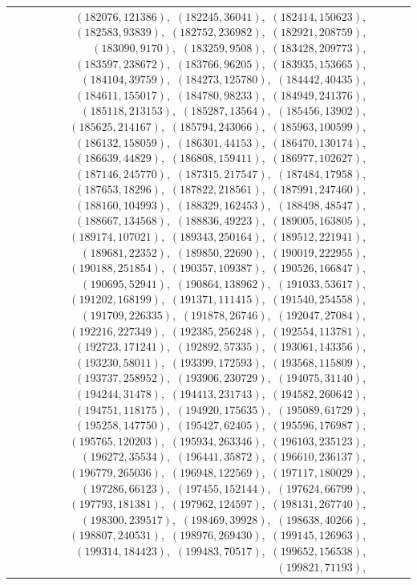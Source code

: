 \documentclass[11pt]{article}
\begin{document}
\begin{longtable}{@{}rrl>{\raggedright\arraybackslash}p{}@{}}
$(182076,121386)$,\allowbreak\ $(182245,36041)$,\allowbreak\ $(182414,150623)$,\allowbreak\ $(182583,93839)$,\allowbreak\ $(182752,236982)$,\allowbreak\ $(182921,208759)$,\allowbreak\ $(183090,9170)$,\allowbreak\ $(183259,9508)$,\allowbreak\ $(183428,209773)$,\allowbreak\ $(183597,238672)$,\allowbreak\ $(183766,96205)$,\allowbreak\ $(183935,153665)$,\allowbreak\ $(184104,39759)$,\allowbreak\ $(184273,125780)$,\allowbreak\ $(184442,40435)$,\allowbreak\ $(184611,155017)$,\allowbreak\ $(184780,98233)$,\allowbreak\ $(184949,241376)$,\allowbreak\ $(185118,213153)$,\allowbreak\ $(185287,13564)$,\allowbreak\ $(185456,13902)$,\allowbreak\ $(185625,214167)$,\allowbreak\ $(185794,243066)$,\allowbreak\ $(185963,100599)$,\allowbreak\ $(186132,158059)$,\allowbreak\ $(186301,44153)$,\allowbreak\ $(186470,130174)$,\allowbreak\ $(186639,44829)$,\allowbreak\ $(186808,159411)$,\allowbreak\ $(186977,102627)$,\allowbreak\ $(187146,245770)$,\allowbreak\ $(187315,217547)$,\allowbreak\ $(187484,17958)$,\allowbreak\ $(187653,18296)$,\allowbreak\ $(187822,218561)$,\allowbreak\ $(187991,247460)$,\allowbreak\ $(188160,104993)$,\allowbreak\ $(188329,162453)$,\allowbreak\ $(188498,48547)$,\allowbreak\ $(188667,134568)$,\allowbreak\ $(188836,49223)$,\allowbreak\ $(189005,163805)$,\allowbreak\ $(189174,107021)$,\allowbreak\ $(189343,250164)$,\allowbreak\ $(189512,221941)$,\allowbreak\ $(189681,22352)$,\allowbreak\ $(189850,22690)$,\allowbreak\ $(190019,222955)$,\allowbreak\ $(190188,251854)$,\allowbreak\ $(190357,109387)$,\allowbreak\ $(190526,166847)$,\allowbreak\ $(190695,52941)$,\allowbreak\ $(190864,138962)$,\allowbreak\ $(191033,53617)$,\allowbreak\ $(191202,168199)$,\allowbreak\ $(191371,111415)$,\allowbreak\ $(191540,254558)$,\allowbreak\ $(191709,226335)$,\allowbreak\ $(191878,26746)$,\allowbreak\ $(192047,27084)$,\allowbreak\ $(192216,227349)$,\allowbreak\ $(192385,256248)$,\allowbreak\ $(192554,113781)$,\allowbreak\ $(192723,171241)$,\allowbreak\ $(192892,57335)$,\allowbreak\ $(193061,143356)$,\allowbreak\ $(193230,58011)$,\allowbreak\ $(193399,172593)$,\allowbreak\ $(193568,115809)$,\allowbreak\ $(193737,258952)$,\allowbreak\ $(193906,230729)$,\allowbreak\ $(194075,31140)$,\allowbreak\ $(194244,31478)$,\allowbreak\ $(194413,231743)$,\allowbreak\ $(194582,260642)$,\allowbreak\ $(194751,118175)$,\allowbreak\ $(194920,175635)$,\allowbreak\ $(195089,61729)$,\allowbreak\ $(195258,147750)$,\allowbreak\ $(195427,62405)$,\allowbreak\ $(195596,176987)$,\allowbreak\ $(195765,120203)$,\allowbreak\ $(195934,263346)$,\allowbreak\ $(196103,235123)$,\allowbreak\ $(196272,35534)$,\allowbreak\ $(196441,35872)$,\allowbreak\ $(196610,236137)$,\allowbreak\ $(196779,265036)$,\allowbreak\ $(196948,122569)$,\allowbreak\ $(197117,180029)$,\allowbreak\ $(197286,66123)$,\allowbreak\ $(197455,152144)$,\allowbreak\ $(197624,66799)$,\allowbreak\ $(197793,181381)$,\allowbreak\ $(197962,124597)$,\allowbreak\ $(198131,267740)$,\allowbreak\ $(198300,239517)$,\allowbreak\ $(198469,39928)$,\allowbreak\ $(198638,40266)$,\allowbreak\ $(198807,240531)$,\allowbreak\ $(198976,269430)$,\allowbreak\ $(199145,126963)$,\allowbreak\ $(199314,184423)$,\allowbreak\ $(199483,70517)$,\allowbreak\ $(199652,156538)$,\allowbreak\ $(199821,71193)$,\allowbreak\ 
\end{longtable}
\end{document}
